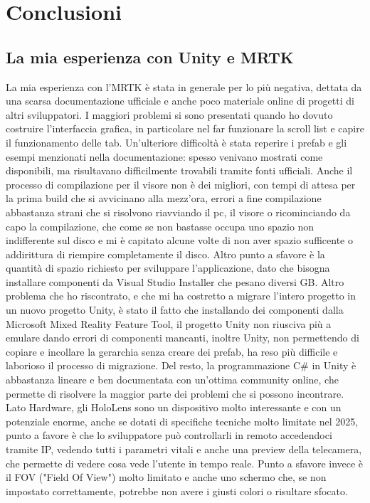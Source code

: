 \chapter{Conclusioni}
\pagestyle{plain}

\section{La mia esperienza con Unity e MRTK}
La mia esperienza con l'MRTK è stata in generale per lo più negativa, dettata da una scarsa documentazione ufficiale e anche poco materiale online di progetti di altri sviluppatori. I maggiori problemi si sono presentati quando ho dovuto costruire l'interfaccia grafica, in particolare nel far funzionare la scroll list e capire il funzionamento delle tab. Un'ulteriore difficoltà è stata reperire i prefab e gli esempi menzionati nella documentazione: spesso venivano mostrati come disponibili, ma risultavano difficilmente trovabili tramite fonti ufficiali. Anche il processo di compilazione per il visore non è dei migliori, con tempi di attesa per la prima build che si avvicinano alla mezz'ora, errori a fine compilazione abbastanza strani che si risolvono riavviando il pc, il visore o ricominciando da capo la compilazione, che come se non bastasse occupa uno spazio non indifferente sul disco e mi è capitato alcune volte di non aver spazio sufficente o addirittura di riempire completamente il disco. Altro punto a sfavore è la quantità di spazio richiesto per sviluppare l'applicazione, dato che bisogna installare componenti da Visual Studio Installer che pesano diversi GB. Altro problema che ho riscontrato, e che mi ha costretto a migrare l'intero progetto in un nuovo progetto Unity, è stato il fatto che installando dei componenti dalla Microsoft Mixed Reality Feature Tool, il progetto Unity non riusciva più a emulare dando errori di componenti mancanti, inoltre Unity, non permettendo di copiare e incollare la gerarchia senza creare dei prefab, ha reso più difficile e laborioso il processo di migrazione. Del resto, la programmazione C\# in Unity è abbastanza lineare e ben documentata con un'ottima community online, che permette di risolvere la maggior parte dei problemi che si possono incontrare. Lato Hardware, gli HoloLens sono un dispositivo molto interessante e con un potenziale enorme, anche se dotati di specifiche tecniche molto limitate nel 2025, punto a favore è che lo sviluppatore può controllarli in remoto accedendoci tramite IP, vedendo tutti i parametri vitali e anche una preview della telecamera, che permette di vedere cosa vede l'utente in tempo reale. Punto a sfavore invece è il FOV ("Field Of View") molto limitato e anche uno schermo che, se non impostato correttamente, potrebbe non avere i giusti colori o risultare sfocato.
